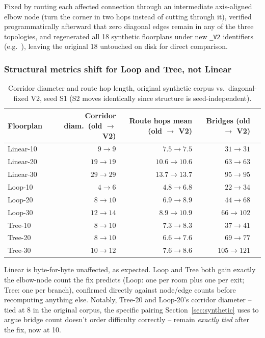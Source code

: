 \documentclass[11pt]{article}
\begin{document}
Fixed by routing each affected connection through an intermediate axis-aligned elbow node (turn the corner in two hops instead of cutting through it), verified programmatically afterward that zero diagonal edges remain in any of the three topologies, and regenerated all 18 synthetic floorplans under new \texttt{\_V2} identifiers (e.g.\ ), leaving the original 18 untouched on disk for direct comparison.

\subsubsection{Structural metrics shift for Loop and Tree, not Linear}

\begin{table}[h]
\centering
\caption{Corridor diameter and route hop length, original synthetic corpus vs.\ diagonal-fixed V2, seed S1 (S2 moves identically since structure is seed-independent).}
\label{tab:v4-structural}
\small
\begin{tabular}{lrrrr}
\toprule
Floorplan & Corridor diam.\ (old $\to$ V2) & Route hops mean (old $\to$ V2) & Bridges (old $\to$ V2) \\
\midrule
Linear-10 & $9 \to 9$ & $7.5 \to 7.5$ & $31 \to 31$ \\
Linear-20 & $19 \to 19$ & $10.6 \to 10.6$ & $63 \to 63$ \\
Linear-30 & $29 \to 29$ & $13.7 \to 13.7$ & $95 \to 95$ \\
Loop-10 & $4 \to 6$ & $4.8 \to 6.8$ & $22 \to 34$ \\
Loop-20 & $8 \to 10$ & $6.9 \to 8.9$ & $44 \to 68$ \\
Loop-30 & $12 \to 14$ & $8.9 \to 10.9$ & $66 \to 102$ \\
Tree-10 & $8 \to 10$ & $7.3 \to 8.3$ & $37 \to 41$ \\
Tree-20 & $8 \to 10$ & $6.6 \to 7.6$ & $69 \to 77$ \\
Tree-30 & $10 \to 12$ & $7.6 \to 8.6$ & $105 \to 121$ \\
\bottomrule
\end{tabular}
\end{table}

Linear is byte-for-byte unaffected, as expected. Loop and Tree both gain exactly the elbow-node count the fix predicts (Loop: one per room plus one per exit; Tree: one per branch), confirmed directly against node/edge counts before recomputing anything else. Notably, Tree-20 and Loop-20's corridor diameter -- tied at 8 in the original corpus, the specific pairing Section~\ref{sec:synthetic} uses to argue bridge count doesn't order difficulty correctly -- remain \emph{exactly tied} after the fix, now at 10.
\end{document}
